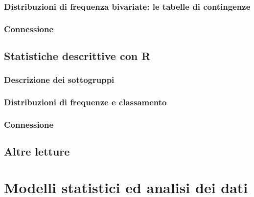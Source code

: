 \documentclass[a4paper,12pt,oneside]{book}
\begin{document}
\hypertarget{distribuzioni-di-frequenza-bivariate-le-tabelle-di-contingenze}{%
\subsection{Distribuzioni di frequenza bivariate: le tabelle di contingenze}\label{distribuzioni-di-frequenza-bivariate-le-tabelle-di-contingenze}}

\hypertarget{connessione}{%
\subsection{Connessione}\label{connessione}}

\hypertarget{statistiche-descrittive-con-r}{%
\section{Statistiche descrittive con R}\label{statistiche-descrittive-con-r}}

\hypertarget{descrizione-dei-sottogruppi}{%
\subsection{Descrizione dei sottogruppi}\label{descrizione-dei-sottogruppi}}

\hypertarget{distribuzioni-di-frequenze-e-classamento-1}{%
\subsection{Distribuzioni di frequenze e classamento}\label{distribuzioni-di-frequenze-e-classamento-1}}

\hypertarget{connessione-1}{%
\subsection{Connessione}\label{connessione-1}}

\hypertarget{altre-letture-2}{%
\section{Altre letture}\label{altre-letture-2}}

\hypertarget{modelli-statistici-ed-analisi-dei-dati}{%
\chapter{Modelli statistici ed analisi dei dati}\label{modelli-statistici-ed-analisi-dei-dati}}
\end{document}
